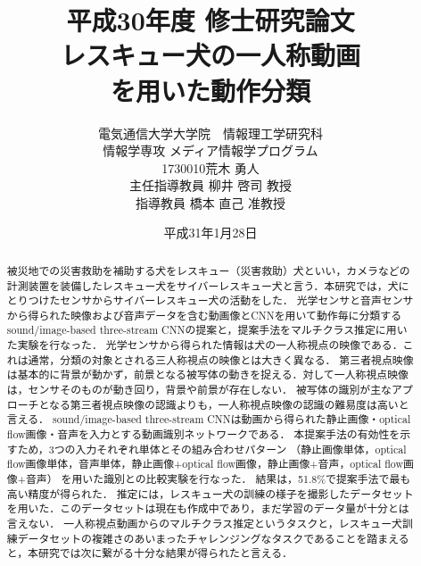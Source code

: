 \documentclass[a4j,12pt]{jreport}
\title{
	平成30年度 修士研究論文\vspace{1cm}\\
	\huge  レスキュー犬の一人称動画\\を用いた動作分類\vspace{6cm}
}
\author{
	電気通信大学大学院　情報理工学研究科\\
	情報学専攻 メディア情報学プログラム\\
	1730010\hspace{1cm}荒木 勇人\\
	主任指導教員 柳井 啓司 教授\\
        指導教員 橋本 直己 准教授
}
\date{
平成31年1月28日
}
\begin{document}
\maketitle
\thispagestyle{empty}
\pagebreak

\begin{abstract}

被災地での災害救助を補助する犬をレスキュー（災害救助）犬といい，カメラなどの計測装置を装備したレスキュー犬をサイバーレスキュー犬と言う．本研究では，犬にとりつけたセンサからサイバーレスキュー犬の活動をした．
光学センサと音声センサから得られた映像および音声データを含む動画像とCNNを用いて動作毎に分類するsound/image-based three-stream CNNの提案と，提案手法をマルチクラス推定に用いた実験を行なった．
光学センサから得られた情報は犬の一人称視点の映像である．これは通常，分類の対象とされる三人称視点の映像とは大きく異なる．
第三者視点映像は基本的に背景が動かず，前景となる被写体の動きを捉える．対して一人称視点映像は，センサそのものが動き回り，背景や前景が存在しない．
被写体の識別が主なアプローチとなる第三者視点映像の認識よりも，一人称視点映像の認識の難易度は高いと言える．
sound/image-based three-stream CNNは動画から得られた静止画像・optical flow画像・音声を入力とする動画識別ネットワークである．
本提案手法の有効性を示すため，3つの入力それぞれ単体とその組み合わせパターン
（静止画像単体，optical flow画像単体，音声単体，静止画像+optical flow画像，静止画像+音声，optical flow画像+音声）
を用いた識別との比較実験を行なった．
結果は，51.8\%で提案手法で最も高い精度が得られた．
推定には，レスキュー犬の訓練の様子を撮影したデータセットを用いた．このデータセットは現在も作成中であり，まだ学習のデータ量が十分とは言えない．
一人称視点動画からのマルチクラス推定というタスクと，レスキュー犬訓練データセットの複雑さのあいまったチャレンジングなタスクであることを踏まえると，本研究では次に繋がる十分な結果が得られたと言える．


\par


\end{abstract}

\pagestyle{jgraduate}


\tableofcontents

\pagebreak

\newpage











%

\end{document}

